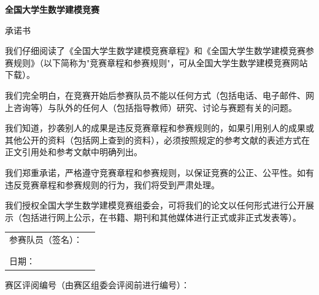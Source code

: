 \documentclass[12pt,a4paper]{ctexart}
\begin{document}
\begin{titlepage}
    \centering
    \vspace*{1cm}

    {\Huge\bfseries 全国大学生数学建模竞赛}

    \vspace{1.5cm}

    {\LARGE 承诺书}

    \vspace{1cm}

    \begin{flushleft}
    \large
    我们仔细阅读了《全国大学生数学建模竞赛章程》和《全国大学生数学建模竞赛参赛规则》（以下简称为"竞赛章程和参赛规则"，可从全国大学生数学建模竞赛网站下载）。

    \vspace{0.5cm}

    我们完全明白，在竞赛开始后参赛队员不能以任何方式（包括电话、电子邮件、网上咨询等）与队外的任何人（包括指导教师）研究、讨论与赛题有关的问题。

    \vspace{0.5cm}

    我们知道，抄袭别人的成果是违反竞赛章程和参赛规则的，如果引用别人的成果或其他公开的资料（包括网上查到的资料），必须按照规定的参考文献的表述方式在正文引用处和参考文献中明确列出。

    \vspace{0.5cm}

    我们郑重承诺，严格遵守竞赛章程和参赛规则，以保证竞赛的公正、公平性。如有违反竞赛章程和参赛规则的行为，我们将受到严肃处理。

    \vspace{0.5cm}

    我们授权全国大学生数学建模竞赛组委会，可将我们的论文以任何形式进行公开展示（包括进行网上公示，在书籍、期刊和其他媒体进行正式或非正式发表等）。
    \end{flushleft}

    \vspace{1cm}

    \begin{flushright}
    \large
    \begin{tabular}{ll}
        参赛队员（签名）：& \underline{\hspace{5cm}} \\[0.5cm]
                          & \underline{\hspace{5cm}} \\[0.5cm]
                          & \underline{\hspace{5cm}} \\[0.5cm]
        日期：            & \underline{\hspace{5cm}} \\
    \end{tabular}
    \end{flushright}

    \vfill

    {\large 赛区评阅编号（由赛区组委会评阅前进行编号）：\underline{\hspace{3cm}}}

\end{titlepage}
\end{document}
